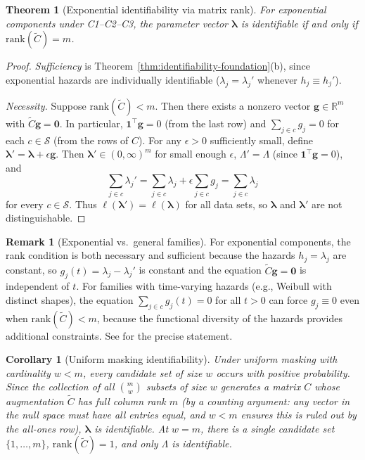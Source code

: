 \documentclass[11pt]{article}
\theoremstyle{definition}
\newtheorem{remark}{Remark}
\theoremstyle{plain}
\newtheorem{theorem}{Theorem}
\newtheorem{corollary}{Corollary}
\renewcommand{\v}[1]{\boldsymbol{#1}}
\newcommand{\rank}{\mathrm{rank}}
\newcommand{\Ctilde}{\tilde{C}}
\begin{document}
\begin{theorem}[Exponential identifiability via matrix rank]
\label{thm:expo-rank}
For exponential components under C1--C2--C3, the parameter vector
$\v{\lambda}$ is identifiable if and only if
$\rank(\Ctilde) = m$.
\end{theorem}

\begin{proof}
\emph{Sufficiency} is
Theorem~\ref{thm:identifiability-foundation}(b), since exponential
hazards are individually identifiable ($\lambda_j = \lambda_j'$
whenever $h_j \equiv h_j'$).

\emph{Necessity.}
Suppose $\rank(\Ctilde) < m$.
Then there exists a nonzero vector $\v{g} \in \mathbb{R}^m$ with
$\Ctilde \v{g} = \v{0}$.
In particular, $\v{1}^\top \v{g} = 0$ (from the last row) and
$\sum_{j \in c} g_j = 0$ for each $c \in \mathcal{S}$ (from the
rows of $C$).
For any $\epsilon > 0$ sufficiently small, define
$\v{\lambda}' = \v{\lambda} + \epsilon \v{g}$.
Then $\v{\lambda}' \in (0,\infty)^m$ for small enough $\epsilon$,
$\Lambda' = \Lambda$ (since $\v{1}^\top \v{g} = 0$), and
\begin{equation}
    \sum_{j \in c} \lambda_j' = \sum_{j \in c} \lambda_j
        + \epsilon \sum_{j \in c} g_j
    = \sum_{j \in c} \lambda_j
\end{equation}
for every $c \in \mathcal{S}$.
Thus $\ell(\v{\lambda}') = \ell(\v{\lambda})$ for all data sets,
so $\v{\lambda}$ and $\v{\lambda}'$ are not distinguishable.
\end{proof}

\begin{remark}[Exponential vs.\ general families]
\label{rem:expo-vs-general}
For exponential components, the rank condition is both necessary and
sufficient because the hazards $h_j = \lambda_j$ are constant, so
$g_j(t) = \lambda_j - \lambda_j'$ is constant and the equation
$\Ctilde \v{g} = \v{0}$ is independent of $t$.
For families with time-varying hazards (e.g., Weibull with distinct
shapes), the equation $\sum_{j \in c} g_j(t) = 0$ for all $t > 0$
can force $g_j \equiv 0$ even when $\rank(\Ctilde) < m$, because
the functional diversity of the hazards provides additional
constraints.
See \citet[Remark~4]{towell2025masked} for the precise statement.
\end{remark}

\begin{corollary}[Uniform masking identifiability]
\label{cor:uniform-masking}
Under uniform masking with cardinality $w < m$, every candidate set
of size $w$ occurs with positive probability.
Since the collection of all $\binom{m}{w}$ subsets of size $w$
generates a matrix $C$ whose augmentation $\Ctilde$ has full column
rank $m$ (by a counting argument: any vector in the null space must
have all entries equal, and $w < m$ ensures this is ruled out by the
all-ones row), $\v{\lambda}$ is identifiable.
At $w = m$, there is a single candidate set $\{1, \ldots, m\}$,
$\rank(\Ctilde) = 1$, and only $\Lambda$ is identifiable.
\end{corollary}
\end{document}
